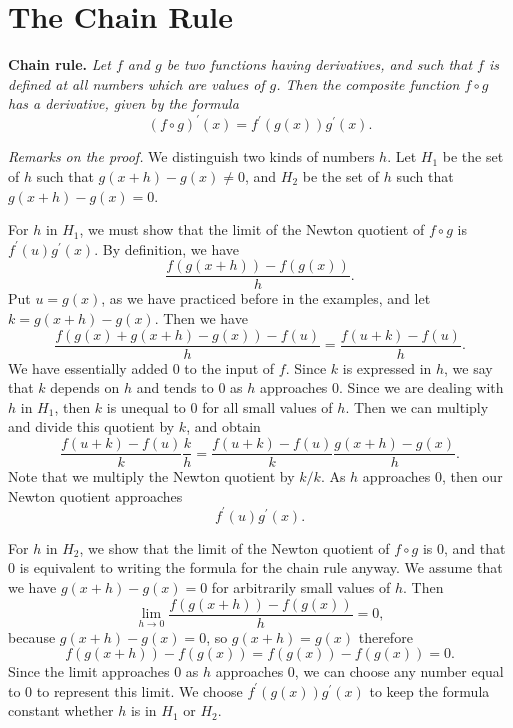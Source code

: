 \section*{The Chain Rule}

\textbf{Chain rule.} \textit{Let $f$ and $g$ be two functions having derivatives, and such that $f$ is defined
  at all numbers which are values of $g$. Then the composite function $f \circ g$ has a derivative, given by
  the formula}
  \[(f \circ g)^\prime(x) = f^\prime(g(x))g^\prime(x).\]

  \textit{Remarks on the proof.} We distinguish two kinds of numbers $h$. Let $H_1$ be the set of $h$ such that
  $g(x + h) - g(x) \ne 0$, and $H_2$ be the set of $h$ such that $g(x + h) - g(x) = 0$.

  For $h$ in $H_1$, we must show that the limit of the Newton quotient of $f \circ g$ is $f^\prime(u)g^\prime(x)$.
  By definition, we have
  \[\frac{f(g(x + h)) - f(g(x))}{h}.\]
  Put $u = g(x)$, as we have practiced before in the examples, and let $k = g(x + h) - g(x)$. Then we have
  \[\frac{f(g(x) + g(x + h) - g(x)) - f(u)}{h} = \frac{f(u + k) - f(u)}{h}.\]
  We have essentially added $0$ to the input of $f$. Since $k$ is expressed in $h$, we say that $k$ depends on
  $h$ and tends to $0$ as $h$ approaches $0$. Since we are dealing with $h$ in $H_1$, then $k$ is unequal to $0$
  for all small values of $h$. Then we can multiply and divide this quotient by $k$, and obtain
  \[\frac{f(u + k) - f(u)}{k} \frac{k}{h} = \frac{f(u + k) - f(u)}{k} \frac{g(x + h) - g(x)}{h}.\]
  Note that we multiply the Newton quotient by $k/k$.
  As $h$ approaches $0$, then our Newton quotient approaches
  \[f^\prime(u)g^\prime(x).\]

  For $h$ in $H_2$, we show that the limit of the Newton quotient of $f \circ g$ is $0$, and that $0$ is equivalent
  to writing the formula for the chain rule anyway. We assume that we have $g(x + h) - g(x) = 0$ for arbitrarily
  small values of $h$. Then
  \[\lim_{h\to0} \frac{f(g(x + h)) - f(g(x))}{h} = 0,\]
  because $g(x + h) - g(x) = 0$, so $g(x + h) = g(x)$ therefore
  \[f(g(x + h)) - f(g(x)) = f(g(x)) - f(g(x)) = 0.\]
  Since the limit approaches $0$ as $h$ approaches $0$, we can choose any number equal to $0$ to represent this
  limit. We choose $f^\prime(g(x))g^\prime(x)$ to keep the formula constant whether $h$ is in $H_1$ or $H_2$.

